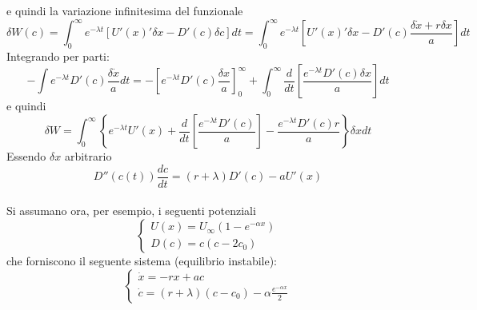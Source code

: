 \documentclass[12pt, a4paper]{book}
\theoremstyle{theorem}
\begin{document}
				e quindi la variazione infinitesima del funzionale
				\begin{equation}
					\delta W(c)=\int_{0}^{\infty}e^{-\lambda t}\left[U'(x)'\delta x-D'(c)\delta c\right]dt=\int_{0}^{\infty}e^{-\lambda t}\left[U'(x)'\delta x-D'(c)\frac{\delta\dot{x}+r\delta x}{a}\right]dt
				\end{equation}
				Integrando per parti:
				\begin{equation}
					-\int e^{-\lambda t}D'(c)\frac{\delta\dot{x}}{a}dt=-\left[ e^{-\lambda t}D'(c)\frac{\delta x}{a} \right]_{0}^{\infty} + \int_{0}^{\infty}\frac{d}{dt}\left[\frac{e^{-\lambda t}D'(c)\delta x}{a}\right]dt
				\end{equation}
				e quindi
				\begin{equation}
					\delta W=\int_{0}^{\infty}\left\{ e^{-\lambda t}U'(x)+\frac{d}{dt}\left[\frac{e^{-\lambda t}D'(c)}{a}\right]-\frac{e^{-\lambda t}D'(c)r}{a} \right\}\delta xdt
				\end{equation}
				Essendo $\delta x$ arbitrario
				\begin{equation}
					D''\left(c(t)\right)\frac{dc}{dt}=(r+\lambda)D'(c)-aU'(x)
				\end{equation}
				\\Si assumano ora, per esempio, i seguenti potenziali
				\begin{equation}
					\begin{cases}
						U(x)=U_{\infty}\left(1-e^{-\alpha x}\right)\\
						D(c)=c\left(c-2c_{0}\right)
					\end{cases}
				\end{equation}
				che forniscono il seguente sistema (equilibrio instabile):
				\begin{equation}
					\begin{cases}
						\dot{x}=-rx+ac\\
						\dot{c}=(r+\lambda)(c-c_{0})-\alpha\frac{e^{-\alpha x}}{2}
					\end{cases}
				\end{equation}
\end{document}
